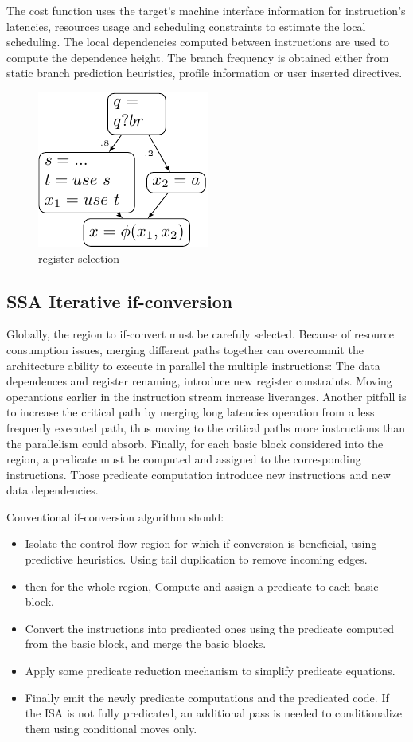 The cost function uses the target's machine interface information for instruction's latencies, resources usage and scheduling constraints to estimate the local scheduling. The local dependencies computed between instructions are used to compute the dependence height. The branch frequency is obtained either from static branch prediction heuristics, profile information or user inserted directives.
\begin{figure}
\centering
    \includegraphics[scale=0.8]{ssa_freq.pdf}
\caption{register selection}
\label{fig:ssa_freq}
\end{figure}

\subsection{SSA Iterative if-conversion}

Globally, the region to if-convert must be carefuly selected. Because of resource consumption issues, merging different paths together can overcommit the architecture ability to execute in parallel the multiple instructions: The data dependences and register renaming, introduce new register constraints. Moving operantions earlier in the instruction stream increase liveranges. 
Another pitfall is to increase the critical path by merging long latencies operation from a less frequenly executed path, thus moving to the critical paths more instructions than the parallelism could absorb.
Finally, for each basic block considered into the region, a predicate must be computed and assigned to the corresponding instructions. Those predicate computation introduce new instructions and new data dependencies.

Conventional if-conversion algorithm should:

\begin{itemize}
\item Isolate the control flow region for which if-conversion is beneficial, using predictive heuristics. Using tail duplication to remove incoming edges. 
\item then for the whole region, Compute and assign a predicate to each basic block.
\item Convert the instructions into predicated ones using the predicate computed from the basic block, and merge the basic blocks.
\item Apply some predicate reduction mechanism to simplify predicate equations.
\item Finally emit the newly predicate computations and the predicated code. If the ISA is not fully predicated, an additional pass is needed to conditionalize them using conditional moves only.
\end{itemize}

